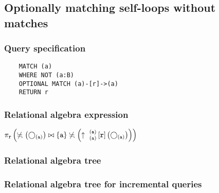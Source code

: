 	\subsection{Optionally matching self-loops without matches}

	\subsubsection*{Query specification}

	\begin{lstlisting}
	MATCH (a)
	WHERE NOT (a:B)
	OPTIONAL MATCH (a)-[r]->(a)
	RETURN r
	\end{lstlisting}


	\subsubsection*{Relational algebra expression}

	$\projection{\var{r}} \left(\alldifferent{} \left(\getvertices{a}{}\right) \join \{\var{a}\} \alldifferent{} \left(\expandout{a}{a}{}{r}{} \left(\getvertices{a}{}\right)\right)\right)$

	\subsubsection*{Relational algebra tree}


	\subsubsection*{Relational algebra tree for incremental queries}

